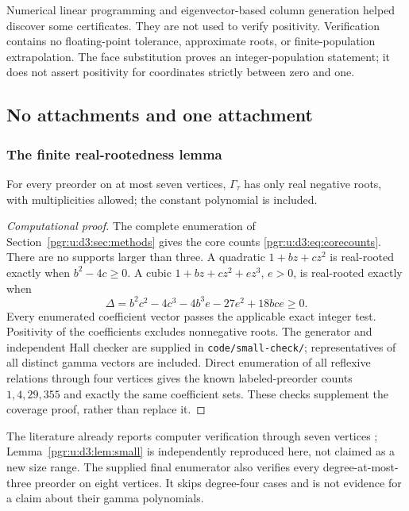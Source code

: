 \documentclass[11pt]{article}
\numberwithin{equation}{section}
\theoremstyle{definition}\newtheorem{definition}[theorem]{Definition}\newtheorem{remark}[theorem]{Remark}
\newcommand{\Ga}{\Gamma}                   %
\begin{document}
Numerical linear programming and eigenvector-based column generation helped discover some certificates. They are not used to verify positivity. Verification contains no floating-point tolerance, approximate roots, or finite-population extrapolation. The face substitution proves an integer-population statement; it does not assert positivity for coordinates strictly between zero and one.

\subsection{No attachments and one attachment}

\subsubsection{The finite real-rootedness lemma}

\begin{lemma}\label{pgr:u:d3:lem:small}
For every preorder on at most seven vertices, $\Ga_\tau$ has only real negative roots, with multiplicities allowed; the constant polynomial is included.
\end{lemma}
\begin{proof}[Computational proof]
The complete enumeration of Section~\ref{pgr:u:d3:sec:methods} gives the core counts \eqref{pgr:u:d3:eq:corecounts}. There are no supports larger than three. A quadratic $1+bz+cz^2$ is real-rooted exactly when $b^2-4c\ge0$. A cubic $1+bz+cz^2+ez^3$, $e>0$, is real-rooted exactly when
\begin{equation}\label{pgr:u:d3:eq:disc}
 \Delta=b^2c^2-4c^3-4b^3e-27e^2+18bce\ge0.
\end{equation}
Every enumerated coefficient vector passes the applicable exact integer test. Positivity of the coefficients excludes nonnegative roots. The generator and independent Hall checker are supplied in \texttt{code/small-check/}; representatives of all distinct gamma vectors are included. Direct enumeration of all reflexive relations through four vertices gives the known labeled-preorder counts $1,4,29,355$ and exactly the same coefficient sets. These checks supplement the coverage proof, rather than replace it.
\end{proof}

The literature already reports computer verification through seven vertices \cite[Section 5]{AC}; Lemma~\ref{pgr:u:d3:lem:small} is independently reproduced here, not claimed as a new size range. The supplied final enumerator also verifies every degree-at-most-three preorder on eight vertices. It skips degree-four cases and is not evidence for a claim about their gamma polynomials.
\end{document}
